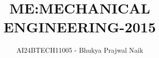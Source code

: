 \documentclass[journal]{IEEEtran}
\begin{document}

\vspace{3cm}

\title{ME:MECHANICAL ENGINEERING-2015}
\author{AI24BTECH11005 - Bhukya Prajwal Naik
}
{\let\newpage\relax\maketitle}

\renewcommand{\thefigure}{\theenumi}
\renewcommand{\thetable}{\theenumi}
\setlength{\intextsep}{10pt} %


\renewcommand{\thetable}{\theenumi}
\end{document}
